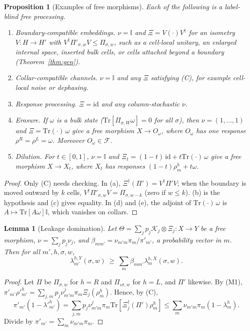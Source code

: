 \documentclass[11pt]{article}
\newtheorem{proposition}[theorem]{Proposition}
\newtheorem{lemma}[theorem]{Lemma}
\theoremstyle{definition}
\theoremstyle{remark}
\newcommand{\Tr}{\mathrm{Tr}}
\newcommand{\one}{\mathbb{I}}
\newcommand{\Free}{\mathcal{F}}
\newcommand{\isig}{\iota\sigma}
\begin{document}
\begin{proposition}[Examples of free morphisms]\label{prop:examples}
Each of the following is a label-blind free processing.
\begin{enumerate}
\item[(a)] \emph{Boundary-compatible embeddings.} $\nu=\one$ and $\Xi=V(\cdot)V^\dagger$ for an isometry $V:H\to H'$ with $V^\dagger\Pi'_{\sigma,w}V\le\Pi_{\sigma,w}$, such as a cell-local unitary, an enlarged internal space, inserted bulk cells, or cells attached beyond a boundary (Theorem~\ref{thm:gen}).
\item[(b)] \emph{Collar-compatible channels.} $\nu=\one$ and any $\Xi$ satisfying (C), for example cell-local noise or dephasing.
\item[(c)] \emph{Response processing.} $\Xi=\mathrm{id}$ and any column-stochastic $\nu$.
\item[(d)] \emph{Erasure.} If $\omega$ is a bulk state ($\Tr[\Pi_{\sigma,W}\omega]=0$ for all $\sigma$), then $\nu=(1,\dots,1)$ and $\Xi=\Tr(\cdot)\,\omega$ give a free morphism $X\to O_\omega$, where $O_\omega$ has one response $\rho^R=\rho^L=\omega$. Moreover $O_\omega\in\Free$.
\item[(e)] \emph{Dilution.} For $t\in[0,1]$, $\nu=\one$ and $\Xi_t=(1-t)\,\mathrm{id}+t\Tr(\cdot)\,\omega$ give a free morphism $X\to X_t$, where $X_t$ has responses $(1-t)\rho^h_m+t\omega$.
\end{enumerate}
\end{proposition}
\begin{proof}
Only (C) needs checking. In (a), $\Xi^\dagger(\Pi')=V^\dagger\Pi'V$; when the boundary is moved outward by $k$ cells, $V^\dagger\Pi'_{\sigma,w}V=\Pi_{\sigma,w-k}$ (zero if $w\le k$). (b) is the hypothesis and (c) gives equality. In (d) and (e), the adjoint of $\Tr(\cdot)\,\omega$ is $A\mapsto\Tr[A\omega]\one$, which vanishes on collars.
\end{proof}

\begin{lemma}[Leakage domination]\label{lem:dom}
Let $\Theta=\sum_jp_j\mathcal K_j\otimes\Xi_j:X\to Y$ be a free morphism, $\nu=\sum_jp_j\nu_j$, and $\beta_{mm'}=\nu_{m'm}\pi_m/\pi'_{m'}$, a probability vector in $m$. Then for all $m',h,\sigma,w$,
\[
\lambda^{h,Y}_{m'}(\sigma,w)\ \ge\ \sum_m\beta_{mm'}\lambda^{h,X}_m(\sigma,w).
\]
\end{lemma}
\begin{proof}
Let $\Pi$ be $\Pi_{\sigma,w}$ for $h=R$ and $\Pi_{\isig,w}$ for $h=L$, and $\Pi'$ likewise. By (M1), $\pi'_{m'}\rho'^h_{m'}=\sum_{j,m}p_j\nu^{j}_{m'm}\pi_m\Xi_j(\rho^h_m)$. Hence, by (C),
\[
\pi'_{m'}(1-\lambda'^h_{m'})=\textstyle\sum_{j,m}p_j\nu^j_{m'm}\pi_m\Tr[\Xi_j^\dagger(\Pi')\rho^h_m]\le\sum_m\nu_{m'm}\pi_m(1-\lambda^h_m).
\]
Divide by $\pi'_{m'}=\sum_m\nu_{m'm}\pi_m$.
\end{proof}
\end{document}
